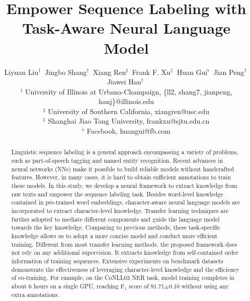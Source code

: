\documentclass[letterpaper]{article} %
\begin{document}
\title{Empower Sequence Labeling with Task-Aware Neural Language Model}


\author{
Liyuan Liu$^{\dag}~$
Jingbo Shang$^{\dag}~$
Xiang Ren$^{\sharp}~$ 
Frank F. Xu$^{\ddag}~$
Huan Gui$^{\flat}~$
Jian Peng$^{\dag}~$
Jiawei Han$^{\dag}~$
\\[0.5ex]
{$^{\dag}$ University of Illinois at Urbana-Champaign, \{ll2, shang7, jianpeng, hanj\}@illinois.edu}\\
{$^{\sharp}$ University of Southern California, xiangren@usc.edu} \\
{$^{\ddag}$ Shanghai Jiao Tong University, frankxu@sjtu.edu.cn}\\
{$^{\flat}$ Facebook, huangui@fb.com}
}

\maketitle

\begin{abstract}

Linguistic sequence labeling is a general approach encompassing a variety of problems, such as part-of-speech tagging and named entity recognition.
Recent advances in neural networks (NNs) make it possible to build reliable models without handcrafted features.
However, in many cases, it is hard to obtain sufficient annotations to train these models.
In this study, we develop a neural framework to extract knowledge from raw texts and empower the sequence labeling task.
Besides word-level knowledge contained in pre-trained word embeddings, character-aware neural language models are incorporated to extract character-level knowledge.
Transfer learning techniques are further adopted to mediate different components and guide the language model towards the key knowledge.
Comparing to previous methods, these task-specific knowledge allows us to adopt a more concise model and conduct more efficient training.
Different from most transfer learning methods, the proposed framework does not rely on any additional supervision.
It extracts knowledge from self-contained order information of training sequences.
Extensive experiments on benchmark datasets demonstrate the effectiveness of leveraging character-level knowledge and the efficiency of co-training.
For example, on the CoNLL03 NER task, model training completes in about 6 hours on a single GPU, reaching F$_1$ score of 91.71$\pm$0.10 without using any extra annotations.
\end{abstract} 
\end{document}
